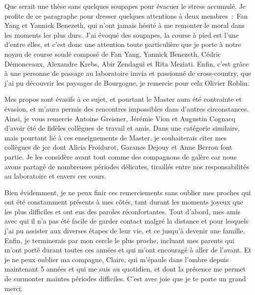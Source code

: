 \documentclass[english,standardlists]{spimubphdthesis}
\begin{document}
Que serait une thèse sans quelques soupapes pour évacuer le stress accumulé. Je profite de ce paragraphe pour dresser quelques attentions à deux membres~:~Fan Yang et Yannick Benezeth, qui n'ont jamais hésité à me remonter le moral dans les moments les plus durs. J'ai évoqué des soupapes, la course à pied est l'une d'entre elles, et c'est donc une attention toute particulière que je porte à notre noyau de course soudé composé de Fan Yang, Yannick Benezeth, Cédric Démonceaux, Alexandre Krebs, Abir Zendagui et Rita Meziati. Enfin, c'est grâce à une personne de passage au laboratoire \gls{imvia} et passionné de cross-country, que j'ai pu découvrir les paysages de Bourgogne, je remercie pour cela Olivier Roblin.\par

Mes propos sont évasifs à ce sujet, et pourtant le Master aura été contrainte et évasion, et m'aura permis des rencontres impossibles dans d'autres circonstances. Ainsi, je vous remercie Antoine Greisner, Jérémie Vion et Augustin Cognacq d'avoir été de fidèles collègues de travail et amis. Dans une catégorie similaire, mais pourtant lié à ces enseignements de Master, je souhaiterais citer mes collègues de \gls{jce} dont Alicia Froidurot, Garance Dejouy et Anne Berrou font partie. Je les considère avant tout comme des compagnons de galère car nous avons partagé de nombreuses périodes délicates, tiraillés entre nos responsabilités au laboratoire et envers ces cours.\par
 
Bien évidemment, je ne peux finir ces remerciements sans oublier mes proches qui ont été constamment présents à mes côtés, tant durant les moments joyeux que les plus difficiles et ont eus des paroles réconfortantes. Tout d'abord, mes amis avec qui il n'a pas été facile de garder contact malgré la distance et pour lesquels j'ai pu assister aux diverses étapes de leur vie, et ce jusqu'à devenir une famille. Enfin, je terminerais par mon cercle le plus proche, incluant mes parents qui m'ont porté durant toutes ces années et qui m'ont encouragé à aller de l'avant. Et je ne peux oublier ma compagne, Claire, qui m'épaule dans l'ombre depuis maintenant 5 années et qui me suis au quotidien, et dont la présence me permet de surmonter maintes périodes difficiles. C'est avec joie que je te porte un grand merci.\par
		
\tableofcontents

\mainmatter
\renewcommand\chaptermark[1]{\markboth{\uppercase{#1}}{}}
\renewcommand\glossarymark[1]{\markboth{\uppercase{#1}}{}}
\end{document}
